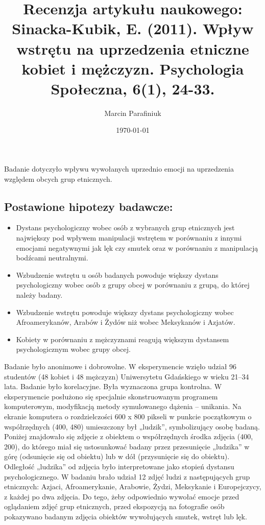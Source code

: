 \documentclass{psychol}
\title{Recenzja artykułu naukowego: Sinacka-Kubik, E. (2011). Wpływ wstrętu na uprzedzenia etniczne kobiet i mężczyzn. Psychologia Społeczna, 6(1), 24-33.}
\author{Marcin Parafiniuk}
\date{\today}
\begin{document}
\maketitle
\doublespacing

\pagebreak


Badanie dotyczyło wpływu wywołanych uprzednio emocji na uprzedzenia względem obcych grup etnicznych.

\subsection{Postawione hipotezy badawcze:}
\begin{itemize}
    \item Dystans psychologiczny wobec osób z wybranych grup etnicznych jest największy pod wpływem manipulacji wstrętem w porównaniu z innymi emocjami negatywnymi jak lęk czy smutek oraz w porównaniu z manipulacją bodźcami neutralnymi.
    \item Wzbudzenie wstrętu u osób badanych powoduje większy dystans psychologiczny wobec osób z grupy obcej w porównaniu z grupą, do której należy badany.
    \item Wzbudzenie wstrętu powoduje większy dystans psychologiczny wobec Afroamerykanów, Arabów i Żydów niż wobec Meksykanów i Azjatów.
    \item Kobiety w porównaniu z mężczyznami reagują większym dystansem psychologicznym wobec grupy obcej.
\end{itemize}

Badanie było anonimowe i dobrowolne. W  eksperymencie wzięło udział 96 studentów (48 kobiet i 48 mężczyzn) Uniwersytetu Gdańskiego w wieku 21–34 lata. Badanie było korelacyjne. Była wyznaczona grupa kontrolna. W eksperymencie posłużono się specjalnie skonstruowanym programem komputerowym, modyfikacją metody symulowanego dążenia – unikania. Na ekranie komputera o rozdzielczości 600 x 800 pikseli w punkcie początkowym o współrzędnych (400, 480)
umieszczony był „ludzik”, symbolizujący osobę badaną.
Poniżej znajdowało się zdjęcie z obiektem o współrzędnych środka zdjęcia (400, 200), do którego miał się ustosunkować badany przez przesunięcie „ludzika” w górę
(odsunięcie się od obiektu) lub w dół (przysunięcie się
do obiektu). Odległość „ludzika” od zdjęcia było interpretowane jako stopień dystansu psychologicznego. W badaniu brało udział 12 zdjęć ludzi z następujących grup etnicznych: Azjaci, Afroamerykanie, Arabowie,
Żydzi, Meksykanie i Europejczycy, z każdej po dwa zdjęcia. Do tego, żeby odpowiednio wywołać emocje przed oglądaniem zdjęć grup etnicznych, przed ekspozycją na fotografie osób pokazywano badanym zdjęcia obiektów wywołujących smutek, wstręt lub lęk.
\end{document}
